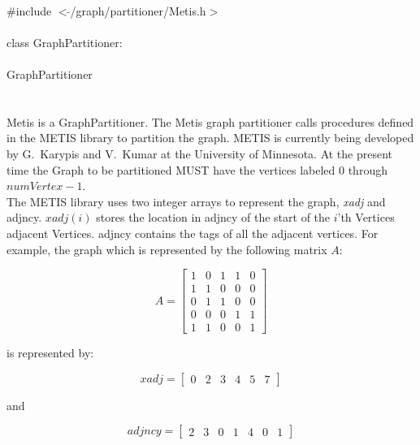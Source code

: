 
   \\
\indent \#include $<\tilde{ }$/graph/partitioner/Metis.h$>$  \\

  \\
\indent class GraphPartitioner:  \\

 \\
\indent GraphPartitioner \\
\indent{} \\

  \\
\indent Metis is a GraphPartitioner. The Metis graph partitioner calls
procedures defined in the METIS library to partition the graph. METIS
is currently being developed by G.~Karypis and V.~Kumar at the
University of Minnesota. At the present time the Graph to be
partitioned MUST have the vertices labeled $0$ through $numVertex-1$. \\

The METIS library uses two integer arrays to represent the graph, {\em
xadj} and \p adjncy. $xadj(i)$ stores the location in \p adjncy
of the start of the $i$'th Vertices adjacent Vertices. \p adjncy
contains the tags of all the adjacent vertices. For example, the graph
which is represented by the following matrix $A$:


$$ A =
\left[
\begin{array}{ccccc}
1 & 0 & 1 & 1 & 0  \\
1 & 1 & 0 & 0 & 0  \\
0 & 1 & 1 & 0 & 0 \\
0 & 0 & 0 & 1 & 1 \\
1 & 1 & 0 & 0 & 1
\end{array}
\right] 
$$

is represented by:

$$
xadj =
\left[
\begin{array}{cccccccccccccc}
0 & 2 & 3 & 4 & 5 & 7
\end{array}
\right] 
$$

and

$$
adjncy =
\left[
\begin{array}{cccccccccccccc}
2 & 3 & 0 & 1 & 4 & 0 & 1
\end{array}
\right] 
$$

